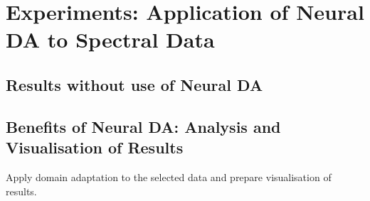 \chapter{Experiments: Application of Neural DA to Spectral Data}
\label{exp_chapter}

\section{Results without use of Neural DA}

\section{Benefits of Neural DA: Analysis and Visualisation of Results}

Apply domain adaptation to the selected data
and prepare visualisation of results.
